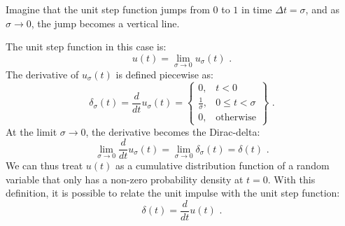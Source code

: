 \begin{marginfigure}
\begin{center}
\end{center}
\caption{Imagine that the unit step function jumps from $0$ to $1$ in time $\Delta t = \sigma$, and as $\sigma \rightarrow 0$, the jump becomes a vertical line.}
\end{marginfigure}
The unit step function in this case is:
\begin{equation}
u(t) = \lim_{\sigma \rightarrow 0}  u_{\sigma}(t) \,\,.
\end{equation}
The derivative of $u_{\sigma}(t)$ is defined piecewise as:
\begin{equation}
\delta_{\sigma}(t) = \frac{d}{dt}u_{\sigma}(t) =\left\{
\begin{array}{cl}
0, & t<0\\
\frac{1}{\sigma}, & 0\le t < \sigma\\
0, & \mathrm{otherwise}
\end{array}
\right\} \,\,.
\end{equation}
At the limit $\sigma\rightarrow 0$, the derivative becomes the Dirac-delta:
\begin{equation}
\lim_{\sigma \rightarrow 0 } \frac{d}{dt}u_{\sigma}(t) = \lim_{\sigma \rightarrow 0 }\delta_{\sigma}(t) = \delta(t) \,\,. 
\end{equation}
We can thus treat $u(t)$ as a cumulative distribution function of a
random variable that only has a non-zero probability density at
$t=0$. With this definition, it is possible to relate the unit impulse
with the unit step function:
\begin{equation}
\boxed{
\delta(t) = \frac{d}{dt}u(t)
} \,\,.
\end{equation}
\fi

